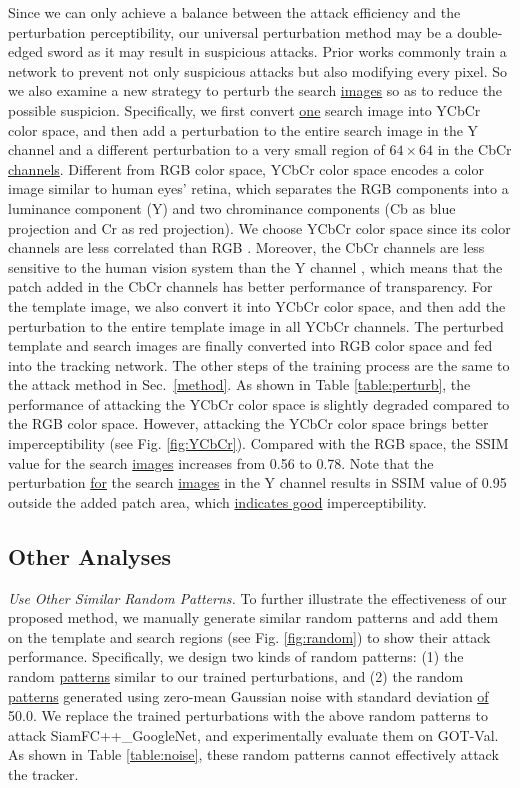 \documentclass[journal]{IEEEtran}
\begin{document}
Since we can only achieve a balance between the attack efficiency and the perturbation perceptibility, our universal perturbation method may be a double-edged sword as it may result in suspicious attacks. Prior works commonly train a network to prevent not only suspicious attacks but also modifying every pixel. So we also examine a new strategy to perturb the search \uline{images} so as to reduce the possible suspicion. Specifically, we first convert \uline{one} search image into YCbCr color space, and then add a perturbation to the entire search image in the Y channel and a different perturbation to a very small region of $64\times64$ in the CbCr \uline{channels}. Different from RGB color space, YCbCr color space encodes a color image similar to human eyes’ retina, which separates the RGB components into a luminance component (Y) and two chrominance components (Cb as blue projection and Cr as red projection). We choose YCbCr color space since its color channels are less correlated than RGB \cite{8630918}. Moreover, the CbCr channels are less sensitive to the human vision system than the Y channel \cite{8630918}, which means that the patch added in the CbCr channels has better performance of transparency. For the template image, we also convert it into YCbCr color space, and then add the perturbation to the entire template image in all YCbCr channels. The perturbed template and search images are finally converted into RGB color space and fed into the tracking network. The other steps of the training process are the same to the attack method in Sec.~\ref{method}. As shown in Table \ref{table:perturb}, the performance of attacking the YCbCr color space is slightly degraded compared to the RGB color space. However, attacking the YCbCr color space brings better imperceptibility (see Fig. \ref{fig:YCbCr}). Compared with the RGB space, the SSIM value for the search \uline{images} increases from 0.56 to 0.78. Note that the perturbation \uline{for} the search \uline{images} in the Y channel results in SSIM value of 0.95 outside the added patch area, which \uline{indicates good} imperceptibility.

\subsection{Other Analyses}
\textit{Use Other Similar Random Patterns.} To further illustrate the effectiveness of our proposed method, we manually generate similar random patterns and add them on the template and search regions (see Fig. \ref{fig:random}) to show their attack performance. Specifically, we design two kinds of random patterns: (1) the random \uline{patterns} similar to our trained perturbations, and (2) the random \uline{patterns} generated using zero-mean Gaussian noise with standard deviation \uline{of} 50.0. We replace the trained perturbations with the above random patterns to attack SiamFC++\_GoogleNet, and experimentally evaluate them on GOT-Val. As shown in Table \ref{table:noise}, these random patterns cannot effectively attack the tracker.
\end{document}
